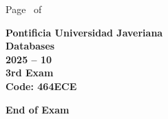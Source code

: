 \documentclass[11pt, addpoints]{exam}\usepackage[utf8]{inputenc}
\begin{document}
\begin{coverpages}
\begin{center}
			\vspace{3mm}
			\leavevmode \hspace{5mm} 
		\end{center}
	\end{coverpages}

	\footer{} {Page \thepage\ of \numpages} {}

	\centering
	\textbf{\Large Pontificia Universidad Javeriana}\\
	\textbf{\Large Databases} \\
	\textbf{\large 2025 -- 10} \\
	\textbf{\large 3rd Exam} \\
	\textbf{Code: 464ECE}


	\begin{questions}
		
		
		
		
		
		
		
		
		
		
		
		
		
		
		
		
		
		
		
		
	\end{questions}

	\vspace{5mm}
	\noindent \textbf{End of Exam}
\end{document}
